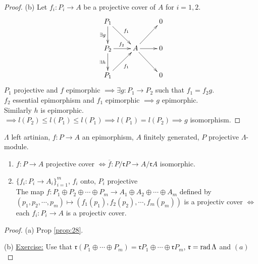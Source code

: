 \begin{thm}
\begin{proof}
(b) Let $f_i : P_i \to A$ be a projective cover of $A$ for $i = 1, 2$.
\[\xymatrix{
P_1 \ar[dr]^{f_1} \ar[d]_{\exists g}&& 0\\
P_2 \ar[r]^{f_2} \ar[d]_{\exists h} & A \ar[r]\ar[dr]\ar[ur] & 0\\
P_1 \ar[ur]_{f_1} && 0
}\]
$P_1$ projective and $f$ epimorphic $\implies \exists g: P_1 \to P_2$ such that $f_1 = f_2g$.\\
$f_2$ essential epimorphism and $f_1$ epimorphic $\implies g$ epimorphic.\\
Similarly $h$ is epimorphic.\\
$\implies l(P_2) \leq l(P_1) \leq l(P_1) \implies l(P_1) = l(P_2) \implies g$ isomorphism. 
\end{proof}
\end{thm}

\begin{prop}
\label{prop:proj_covers->top_iso}
$\Lambda$ left artinian, $f: P \to A$ an epimorphism, $A$ finitely generated, $P$ projective $\Lambda$-module.
\begin{enumerate}
\item[(a)] $f:P \to A$ projective cover $\iff \overline{f}: P/\mathfrak{r}P \to A/\mathfrak{r}A$ isomorphic.
\item[(b)] $\{ f_i : P_i \to A_i \}_{i=1}^m$, $f_i$ onto, $P_i$ projective\\
The map $f: P_1 \oplus P_2 \oplus \cdots \oplus P_m \to A_1 \oplus A_2 \oplus \cdots \oplus A_m $ defined by $(p_1, p_2, \cdots , p_m) \mapsto (f_1(p_1), f_2(p_2), \cdots , f_m(p_m))$ is a projectiv cover $\iff$ each $f_i:P_i \to A$ is a projectiv cover.
\end{enumerate}

\begin{proof}
(a) Prop \ref{prop:28}.

(b) \underline{Exercise:} Use that $\mathfrak{r}(P_1 \oplus \cdots
\oplus P_m) = \mathfrak{r}P_1 \oplus \cdots \oplus \mathfrak{r}P_m$,
$\mathfrak{r} = \operatorname{rad}\nolimits \Lambda$ and $(a)$
\end{proof}
\end{prop}

